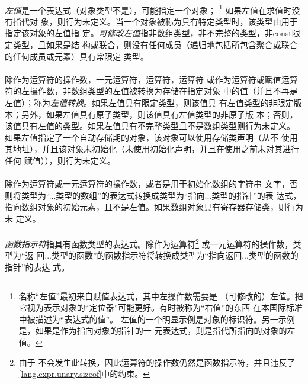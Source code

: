 \paragraph{}
\textit{左值}是一个表达式（对象类型不是），可能指定一个对象；
\footnote{名称``左值''最初来自赋值表达式，其中左操作数需要是
（可修改的）左值。把它视为表示对象的``定位器''可能更好。有时被称为``右值''的东西
在本国际标准中被描述为``表达式的值''。\linebreak
左值的一个明显示例是对象的标识符。另一示例是，如果是作为指向对象的指针的一
元表达式，则是指代所指向的对象的左值。} 如果左值在求值时没有指代对
象，则行为未定义。当一个对象被称为具有特定类型时，该类型由用于指定该对象的左值指
定。\textit{可修改左值}指非数组类型，非不完整的类型，非const限定类型，且如果是结
构或联合，则没有任何成员（递归地包括所包含聚合或联合的任何成员或元素）具有常限定
类型。

\paragraph{}
除作为运算符的操作数，一元\tm{\&}运算符，\tm{++}运算符，\tm{-}运算符
或作为运算符或赋值运算符的左操作数，非数组类型的左值被转换为存储在指定对象
中的值（并且不再是左值）；称为\textit{左值转换}。如果左值具有限定类型，则该值具
有左值类型的非限定版本；另外，如果左值具有原子类型，则该值具有左值类型的非原子版
本；否则，该值具有左值的类型。如果左值具有不完整类型且不是数组类型则行为未定义。
如果左值指定了一个自动存储期的对象，该对象可以使用存储类声明（从不
使用其地址），并且该对象未初始化（未使用初始化声明，并且在使用之前未对其进行任何
赋值）），则行为未定义。

\paragraph{}
除作为运算符或一元\tm{\&}运算符的操作数，或者是用于初始化数组的字符串
文字，否则将类型为``...类型的数组''的表达式转换成类型为``指向...类型的指针''的表
达式，指向数组对象的初始元素，且不是左值。如果数组对象具有寄存器存储类，则行为未
定义。

\paragraph{}
\textit{函数指示符}指具有函数类型的表达式。除作为运算符\footnote{由于
不会发生此转换，因此运算符的操作数仍然是函数指示符，并且违反了
\ref{lang.expr.unary.sizeof}中的约束。} 或一元\tm{\&}运算符的操作数，类型为``返
回...类型的函数''的函数指示符将转换成类型为``指向返回...类型的函数的指针''的表达
式。

